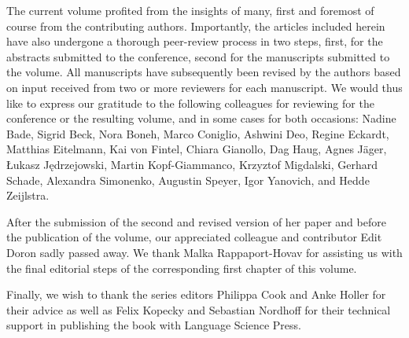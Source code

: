 \begin{refsection}

The current volume profited from the insights of many, first and foremost of course from the contributing authors. Importantly, the articles included herein have also undergone a thorough peer-review process in two steps, first, for the abstracts submitted to the conference, second for the manuscripts submitted to the volume. All manuscripts have subsequently been revised by the authors based on input received from two or more reviewers for each manuscript. We would thus like to express our gratitude to the following colleagues for reviewing for the conference or the resulting volume, and in some cases for both occasions: Nadine Bade, Sigrid Beck, Nora Boneh, Marco Coniglio, Ashwini Deo, Regine Eckardt, Matthias Eitelmann, Kai von Fintel, Chiara Gianollo, Dag Haug, Agnes Jäger, Łukasz Jędrzejowski, Martin Kopf-Giammanco, Krzyztof Migdalski, Gerhard Schade, Alexandra Simonenko, Augustin Speyer, Igor Yanovich, and Hedde Zeijlstra. 

After the submission of the second and revised version of her paper and before the publication of the volume, our appreciated colleague and contributor Edit Doron sadly passed away. We thank Malka Rappaport-Hovav for assisting us with the final editorial steps of the corresponding first chapter of this volume. 

Finally, we wish to thank the series editors Philippa Cook and Anke Holler for their advice as well as Felix Kopecky and Sebastian Nordhoff for their technical support in publishing the book with Language Science Press.

\end{refsection}

